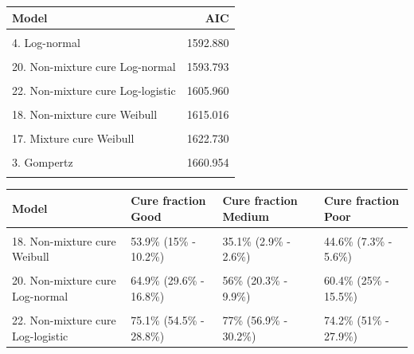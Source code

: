 \documentclass[]{article}
\begin{document}
\begin{table}[H]
\centering
\begin{tabular}{lr}
\toprule
Model & AIC\\
\midrule
\cellcolor{gray!6}{7. Generalised Gamma} & \cellcolor{gray!6}{1589.049}\\
4. Log-normal & 1592.880\\
\cellcolor{gray!6}{19. Mixture cure Log-normal} & \cellcolor{gray!6}{1593.762}\\
20. Non-mixture cure Log-normal & 1593.793\\
\cellcolor{gray!6}{21. Mixture cure Log-logistic} & \cellcolor{gray!6}{1604.290}\\
22. Non-mixture cure Log-logistic & 1605.960\\
\cellcolor{gray!6}{5. Log-logistic} & \cellcolor{gray!6}{1609.294}\\
18. Non-mixture cure Weibull & 1615.016\\
\cellcolor{gray!6}{6. Gamma} & \cellcolor{gray!6}{1621.982}\\
17. Mixture cure Weibull & 1622.730\\
\cellcolor{gray!6}{2. Weibull} & \cellcolor{gray!6}{1632.618}\\
3. Gompertz & 1660.954\\
\cellcolor{gray!6}{1. Exponential} & \cellcolor{gray!6}{1668.212}\\
\bottomrule
\end{tabular}
\end{table}

\begin{table}[H]
\centering
\begin{tabular}{llll}
\toprule
Model & Cure fraction Good & Cure fraction Medium & Cure fraction Poor\\
\midrule
\cellcolor{gray!6}{17. Mixture cure Weibull} & \cellcolor{gray!6}{65.2\% (30.9\% - 17.9\%)} & \cellcolor{gray!6}{57.1\% (19.3\% - 10.7\%)} & \cellcolor{gray!6}{60.3\% (23.4\% - 13.6\%)}\\
18. Non-mixture cure Weibull & 53.9\% (15\% - 10.2\%) & 35.1\% (2.9\% - 2.6\%) & 44.6\% (7.3\% - 5.6\%)\\
\cellcolor{gray!6}{19. Mixture cure Log-normal} & \cellcolor{gray!6}{75\% (53.1\% - 29.5\%)} & \cellcolor{gray!6}{76.7\% (65.8\% - 35.3\%)} & \cellcolor{gray!6}{74.2\% (54.4\% - 29.6\%)}\\
20. Non-mixture cure Log-normal & 64.9\% (29.6\% - 16.8\%) & 56\% (20.3\% - 9.9\%) & 60.4\% (25\% - 15.5\%)\\
\cellcolor{gray!6}{21. Mixture cure Log-logistic} & \cellcolor{gray!6}{53.2\% (12.9\% - 9.1\%)} & \cellcolor{gray!6}{32.6\% (4.7\% - 2.7\%)} & \cellcolor{gray!6}{44.8\% (9.7\% - 8\%)}\\
22. Non-mixture cure Log-logistic & 75.1\% (54.5\% - 28.8\%) & 77\% (56.9\% - 30.2\%) & 74.2\% (51\% - 27.9\%)\\
\bottomrule
\end{tabular}
\end{table}
\end{document}
